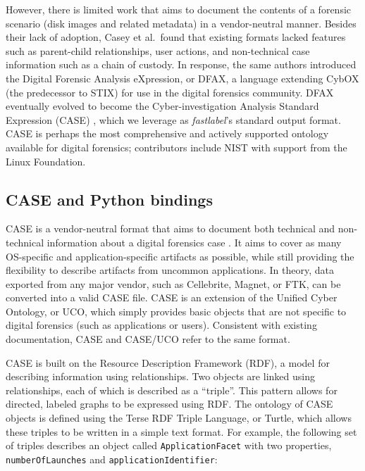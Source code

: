 \documentclass[letterpaper,12pt]{report}
\begin{document}
However, there is limited work that aims to document the contents of a
forensic scenario (disk images and related metadata) in a vendor-neutral
manner. Besides their lack of adoption, Casey et al.~found that existing
formats lacked features such as parent-child relationships, user
actions, and non-technical case information such as a chain of custody.
In response, the same authors introduced the Digital Forensic Analysis
eXpression, or DFAX, a language extending CybOX (the predecessor to
STIX) for use in the digital forensics community. DFAX eventually
evolved to become the Cyber-investigation Analysis Standard Expression
(CASE) \cite{caseyAdvancingCoordinatedCyberinvestigations2017},
which we leverage as \emph{fastlabel}'s standard output format. CASE is
perhaps the most comprehensive and actively supported ontology available
for digital forensics; contributors include NIST with support from the
Linux Foundation.

\subsection{CASE and Python
bindings}\label{case-and-python-bindings}

CASE is a vendor-neutral format that aims to document both technical and
non-technical information about a digital forensics case
\cite{caseyAdvancingCoordinatedCyberinvestigations2017}. It aims to
cover as many OS-specific and application-specific artifacts as
possible, while still providing the flexibility to describe artifacts
from uncommon applications. In theory, data exported from any major
vendor, such as Cellebrite, Magnet, or FTK, can be converted into a
valid CASE file. CASE is an extension of the Unified Cyber Ontology, or
UCO, which simply provides basic objects that are not specific to
digital forensics (such as applications or users). Consistent with
existing documentation, CASE and CASE/UCO refer to the same format.

CASE is built on the Resource Description Framework (RDF), a model for
describing information using relationships. Two objects are linked using
relationships, each of which is described as a ``triple''. This pattern
allows for directed, labeled graphs to be expressed using RDF. The
ontology of CASE objects is defined using the Terse RDF Triple Language,
or Turtle, which allows these triples to be written in a simple text
format. For example, the following set of triples describes an object
called \texttt{ApplicationFacet} with two properties,
\texttt{numberOfLaunches} and \texttt{applicationIdentifier}:
\end{document}
